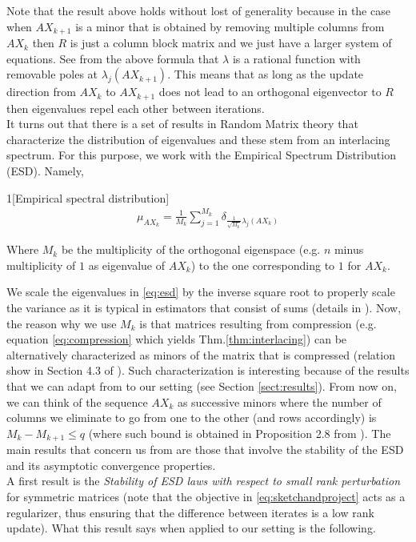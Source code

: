 \documentclass[12pt,conference,compsocconf]{IEEEtran}
\begin{document}
Note that the result above holds without lost of generality because in the case when $AX_{k+1}$ is a minor that is obtained by removing multiple columns from $AX_k$ then $R$ is just a column block matrix and we just have a larger system of equations.
See from the above formula that $\lambda$ is a rational function with removable poles at $\lambda_j(AX_{k+1})$. This means that as long as the update direction from $AX_k$ to $AX_{k+1}$ does not lead to an orthogonal eigenvector to $R$ then eigenvalues repel each other between iterations.\\
It turns out that there is a set of results in Random Matrix theory that characterize the distribution of eigenvalues and these stem from an interlacing spectrum. For this purpose, we work with the Empirical Spectrum Distribution (ESD). Namely,
\begin{customdefinition}{1}[Empirical spectral distribution]
\begin{align}\label{eq:esd}
	\mu_{AX_k} = \frac{1}{M_k} \sum _{j=1}^{M_k} \delta_{\frac{1}{\sqrt{M_k}}\lambda_j(AX_k)}
\end{align}

Where $M_k$ be the multiplicity of the orthogonal eigenspace (e.g. $n$ minus multiplicity of $1$ as eigenvalue of $AX_k$) to the one corresponding to $1$ for $AX_k$. 
\end{customdefinition}
We scale the eigenvalues in \eqref{eq:esd} by the inverse square root to properly scale the variance as it is typical in estimators that consist of sums (details in \cite{Tao}).
Now, the reason why we use $M_k$ is that matrices resulting from compression (e.g. equation \eqref{eq:compression} which yields Thm.\ref{thm:interlacing}) can be alternatively characterized as minors of the matrix that is compressed (relation show in Section 4.3 of \cite{Horn}). Such characterization is interesting because of the results that we can adapt from \cite{Tao} to our setting (see Section \ref{sect:results}). From now on, we can think of the sequence $AX_k$ as successive minors where the number of columns we eliminate to go from one to the other (and rows accordingly) is $M_k-M_{k+1} \leq q$ (where such bound is obtained in Proposition 2.8 from \cite{Gratton}).
The main results that concern us from \cite{Tao} are those that involve the stability of the ESD and its asymptotic convergence properties.\\
A first result is the \textit{Stability of ESD laws with respect to small rank perturbation} for symmetric matrices (note that the objective in \eqref{eq:sketchandproject} acts as a regularizer, thus ensuring that the difference between iterates is a low rank update). What this result says when applied to our setting is the following.
\end{document}
